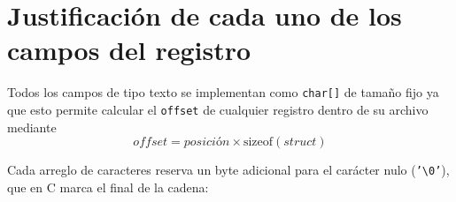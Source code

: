 \section{Justificación de cada uno de los campos del registro}
\label{sec:justificacion-campos}

Todos los campos de tipo texto se implementan como \texttt{char[]} de tamaño fijo ya que esto permite 
calcular el \texttt{offset} de cualquier registro dentro de su archivo mediante 
\[
\mathit{offset} = \mathit{posición} \times \mathrm{sizeof}(\mathit{struct})
\]

Cada arreglo de caracteres reserva un byte adicional para el carácter nulo (\texttt{'\textbackslash 0'}), que en C marca el final de la cadena:


